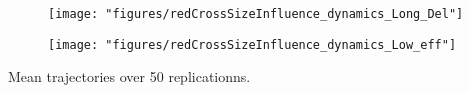 \documentclass{myBeamer}
\begin{document}
{%

\bigskip
\noindent
\begin{minipage}{0.45\linewidth}
\begin{figure}[h]
    \centering
     \texttt{[image: "figures/redCrossSizeInfluence\_dynamics\_Long\_Del"]}  
\end{figure}
\end{minipage}
\begin{minipage}{0.45\linewidth}
\begin{figure}[h]
    \centering
     \texttt{[image: "figures/redCrossSizeInfluence\_dynamics\_Low\_eff"]}  
\end{figure}
\end{minipage}
\begin{center}
Mean trajectories over 50 replicationns.
\end{center}
}



%
%
%
%
\end{document}
